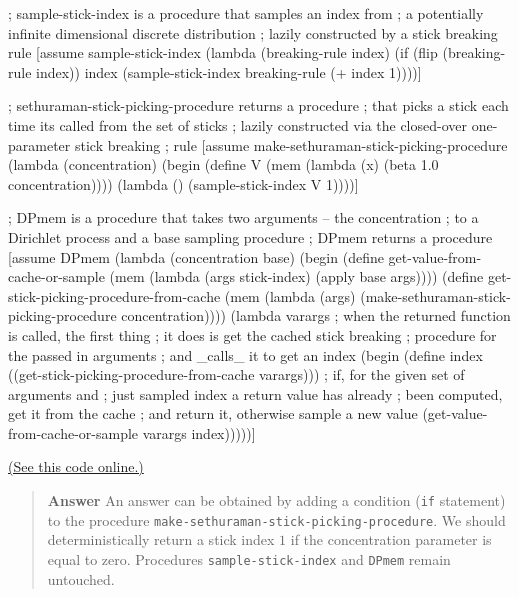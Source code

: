 \documentclass[11pt,reqno]{amsart}
\newif\ifanswers
\newcommand{\+}[1]{\ensuremath{{\mathbf{#1}}}}
\begin{document}
\begin{code}{}{}
; sample-stick-index is a procedure that samples an index from
; a potentially infinite dimensional discrete distribution 
; lazily constructed by a stick breaking rule
[assume sample-stick-index (lambda (breaking-rule index)
  (if (flip (breaking-rule index))
      index
      (sample-stick-index breaking-rule (+ index 1))))]


; sethuraman-stick-picking-procedure returns a procedure 
; that picks a stick each time its called from the set of sticks
; lazily constructed via the closed-over one-parameter stick breaking
; rule
[assume make-sethuraman-stick-picking-procedure (lambda (concentration)
  (begin (define V (mem (lambda (x) (beta 1.0 concentration))))
    (lambda () (sample-stick-index V 1))))] 


; DPmem is a procedure that takes two arguments -- the concentration
; to a Dirichlet process and a base sampling procedure
; DPmem returns a procedure 
[assume DPmem (lambda (concentration base)
  (begin 
    (define get-value-from-cache-or-sample 
                           (mem (lambda (args stick-index) 
                                        (apply base args))))
    (define get-stick-picking-procedure-from-cache 
                            (mem (lambda (args) 
              (make-sethuraman-stick-picking-procedure concentration))))
    (lambda varargs
        ; when the returned function is called, the first thing 
        ; it does is get  the cached stick breaking 
        ; procedure for the passed in arguments
        ; and _calls_ it to get an index
        (begin 
           (define index ((get-stick-picking-procedure-from-cache varargs)))
            ; if, for the given set of arguments and 
            ; just sampled index a return value has already
            ; been computed, get it from the cache
            ; and return it, otherwise sample a new value
            (get-value-from-cache-or-sample varargs index)))))]

\end{code}
\href{http://www.robots.ox.ac.uk/~fwood/anglican/teaching/mlss2014/py_mem/code/1_1.anglican}{(See this code online.)}

\ifanswers
\begin{quotation}
 {\bf Answer } 
 An answer can be obtained by adding a condition ({\tt if} statement) to the procedure {\tt make-sethuraman-stick-picking-procedure}.
 We should deterministically return a stick index $1$ if the concentration parameter is equal to zero.
 Procedures {\tt sample-stick-index} and {\tt DPmem} remain untouched.
 \end{quotation}
 
\end{document}
